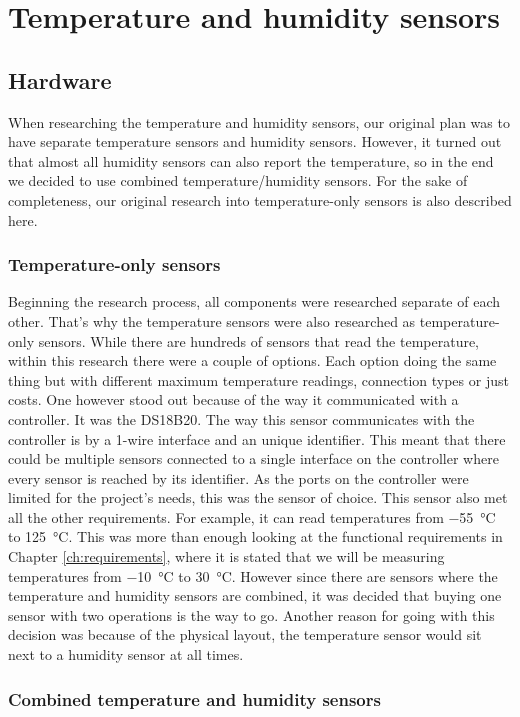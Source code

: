 \documentclass[a4paper,oneside]{book}
\begin{document}
\section{Temperature and humidity sensors}
\subsection{Hardware}
When researching the temperature and humidity sensors, our original plan was to
have separate temperature sensors and humidity sensors. However, it turned out
that almost all humidity sensors can also report the temperature, so in the end
we decided to use combined temperature/humidity sensors. For the sake of
completeness, our original research into temperature-only sensors is also
described here.

\subsubsection{Temperature-only sensors}
Beginning the research process, all components were researched separate of each
other. That's why the temperature sensors were also researched as
temperature-only sensors. While there are hundreds of sensors that read the
temperature, within this research there were a couple of options. Each option
doing the same thing but with different maximum temperature readings,
connection types or just costs. One however stood out because of the way it
communicated with a controller. It was the DS18B20. The way this sensor
communicates with the controller is by a 1-wire interface and an unique
identifier. This meant that there could be multiple sensors connected to a
single interface on the controller where every sensor is reached by its
identifier. As the ports on the controller were limited for the project's
needs, this was the sensor of choice. This sensor also met all the other
requirements. For example, it can read temperatures from \SI{-55}{\celsius} to
\SI{+125}{\celsius}. This was more than enough looking at the functional
requirements in Chapter \ref{ch:requirements}, where it is stated that we will
be measuring temperatures from \SI{-10}{\celsius} to \SI{+30}{\celsius}.
However since there are sensors where the temperature and humidity sensors are
combined, it was decided that buying one sensor with two operations is the way
to go. Another reason for going with this decision was because of the physical
layout, the temperature sensor would sit next to a humidity sensor at all
times.

\subsubsection{Combined temperature and humidity sensors}
\end{document}
